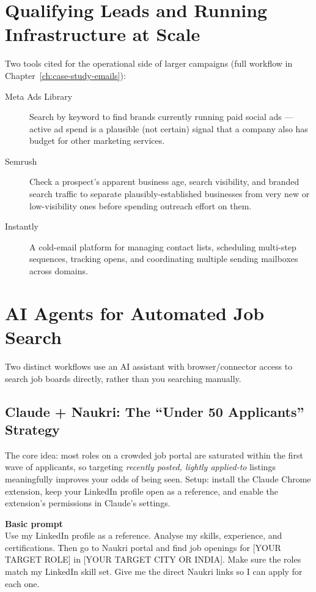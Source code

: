 \section{Qualifying Leads and Running Infrastructure at Scale}

Two tools cited for the operational side of larger campaigns (full workflow in
Chapter~\ref{ch:case-study-emails}):

\begin{description}
  \item[Meta Ads Library] Search by keyword to find brands currently running paid social ads — active ad spend
  is a plausible (not certain) signal that a company also has budget for other marketing services.
  \item[Semrush] Check a prospect's apparent business age, search visibility, and branded search traffic to
  separate plausibly-established businesses from very new or low-visibility ones before spending outreach effort
  on them.
  \item[Instantly] A cold-email platform for managing contact lists, scheduling multi-step sequences, tracking
  opens, and coordinating multiple sending mailboxes across domains.
\end{description}

\section{AI Agents for Automated Job Search}

Two distinct workflows use an AI assistant with browser/connector access to search job boards directly, rather
than you searching manually.

\subsection{Claude + Naukri: The ``Under 50 Applicants'' Strategy}

The core idea: most roles on a crowded job portal are saturated within the first wave of applicants, so
targeting \emph{recently posted, lightly applied-to} listings meaningfully improves your odds of being seen.
Setup: install the Claude Chrome extension, keep your LinkedIn profile open as a reference, and enable the
extension's permissions in Claude's settings.

\begin{template}
\textbf{Basic prompt}\\[4pt]
Use my LinkedIn profile as a reference. Analyse my skills, experience, and certifications. Then go to Naukri
portal and find job openings for [YOUR TARGET ROLE] in [YOUR TARGET CITY OR INDIA]. Make sure the roles match my
LinkedIn skill set. Give me the direct Naukri links so I can apply for each one.
\end{template}

